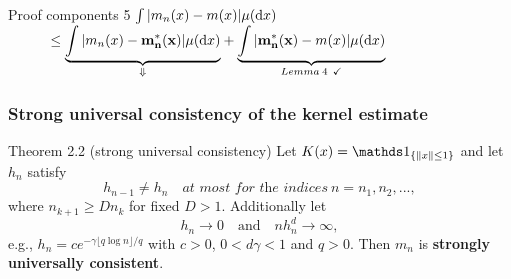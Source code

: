 \begin{frame}{Proof components 5 \checkmark}
$\int |m_n(x)-m(x)| \mu(\mathop{}\!\mathrm{d}{x})$ \\
$\quad\quad\quad \leq \underset{\Downarrow}{\underbrace{\int |m_n(x)- \mathbf{m_n^*(x)} | \mu(\diff{x})}} + \underset{Lemma \: 4 \: \: \checkmark}{\underbrace{\int | \mathbf{m_n^*(x)} -m(x)| \mu(\diff{x})}}$
\end{frame}

\begin{frame}
\frametitle{Strong universal consistency of the kernel estimate}
\begin{alertblock}{Theorem 2.2 (strong universal consistency)}
Let $K(x) = \ind{\{\|x\|\leq1\}}$ and let $h_n$ satisfy 
\[h_{n-1} \neq h_n \quad \textit{at most for the indices} \ n=n_1,n_2,...,\]
where $n_{k+1} \geq Dn_k$ for fixed $D>1$. Additionally let 
\[ h_n \to 0 \quad \text{and} \quad nh_n^d \to \infty,\]
e.g., $h_n = ce^{-\gamma \lfloor q \log n \rfloor/q}$ with $c>0$, $0<d\gamma<1$ and $q>0$. Then $m_n$ is \textbf{strongly universally consistent}.
\end{alertblock}
\end{frame}

